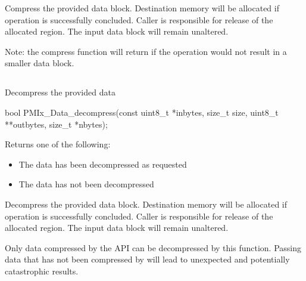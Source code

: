 Compress the provided data block. Destination memory
will be allocated if operation is successfully concluded. Caller
is responsible for release of the allocated region. The input
data block will remain unaltered.

Note: the compress function will return  if the operation
would not result in a smaller data block.



\subsection{}

\summary

Decompress the provided data

\format

\cspecificstart
\begin{codepar}
bool
PMIx_Data_decompress(const uint8_t *inbytes, size_t size,
                     uint8_t **outbytes, size_t *nbytes);
\end{codepar}
\cspecificend

\begin{arglist}
\end{arglist}

Returns one of the following:
\begin{itemize}
\item {} The data has been decompressed as requested
\item {} The data has not been decompressed
\end{itemize}

\descr

Decompress the provided data block. Destination memory
will be allocated if operation is successfully concluded. Caller
is responsible for release of the allocated region. The input
data block will remain unaltered.

Only data compressed by the  \ac{API}
can be decompressed by this function. Passing data that has not
been compressed by  will lead to
unexpected and potentially catastrophic results.

